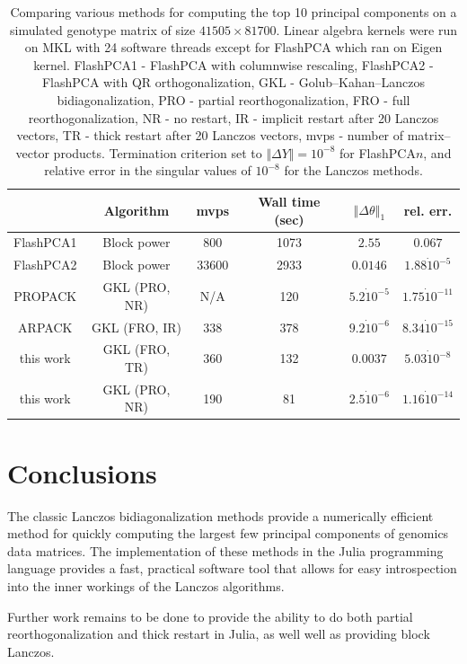 \documentclass[review]{siamart0516}
\begin{document}
\begin{table}
\begin{tabular}{|c|c|c|c|c|c|}
\hline
 & Algorithm & mvps & Wall time (sec) & $\left\Vert \Delta\theta\right\Vert _{1}$ & rel. err. \tabularnewline
\hline
\hline
FlashPCA1 & Block power & 800 & 1073 & $2.55$ & $0.067$ \tabularnewline
\hline
FlashPCA2 & Block power & 33600 & 2933 & $0.0146$ & $1.88\dot10^{-5}$ \tabularnewline
\hline
PROPACK & GKL (PRO, NR) & N/A & 120 & $5.2\dot10^{-5}$ & $1.75\dot10^{-11}$ \tabularnewline
\hline
ARPACK & GKL (FRO, IR) & 338 & 378 & $9.2\dot10^{-6}$ & $8.34\dot10^{-15}$ \tabularnewline
\hline
this work & GKL (FRO, TR) & 360 & 132 & $0.0037$ & $5.03\dot10^{-8}$ \tabularnewline
\hline
this work & GKL (PRO, NR) & 190 & 81 & $2.5\dot10^{-6}$ & $1.16\dot10^{-14}$ \tabularnewline
\hline
\end{tabular}

\caption{Comparing various methods for computing the top 10 principal
components on a simulated genotype matrix of size $41505\times81700$.
Linear algebra kernels were run on MKL with 24 software threads except for FlashPCA which ran on Eigen kernel.
FlashPCA1 - FlashPCA with columnwise rescaling,
FlashPCA2 - FlashPCA with QR orthogonalization,
GKL - Golub--Kahan--Lanczos bidiagonalization,
PRO - partial reorthogonalization,
FRO - full reorthogonalization,
NR - no restart,
IR - implicit restart after 20 Lanczos vectors,
TR - thick restart after 20 Lanczos vectors,
mvps - number of matrix--vector products.
Termination criterion set to $\Vert \Delta Y\Vert = 10^{-8}$ for FlashPCA$n$,
and relative error in the singular values of $10^{-8}$ for the Lanczos methods.
}
\end{table}


\section{Conclusions}

The classic Lanczos bidiagonalization methods provide a numerically efficient
method for quickly computing the largest few principal components of genomics
data matrices. The implementation of these methods in the Julia programming
language provides a fast, practical software tool that allows for easy
introspection into the inner workings of the Lanczos algorithms.

Further work remains to be done to provide the ability to do both partial
reorthogonalization and thick restart in Julia, as well well as providing
block Lanczos.
\end{document}
